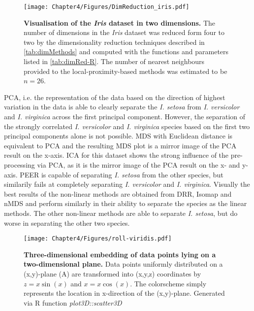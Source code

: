 \begin{figure}[h!]
	\centering
	\texttt{[image: Chapter4/Figures/DimReduction\_iris.pdf]}
	\caption[\textbf{Visualisation of the \textit{Iris} dataset in two dimensions.}]{\textbf{Visualisation of the \textit{Iris} dataset in two dimensions.} The number of dimensions in the \textit{Iris} dataset was reduced form four to two by the dimensionality reduction techniques described in \cref{tab:dimMethods} and computed with the functions and parameters listed in \cref{tab:dimRed-R}. The number of nearest neighbours provided to the local-proximity-based methods was estimated to be \(n=26\).} 
	 	\label{fig:dimRed-iris}
\end{figure}

PCA, i.e. the representation of the data based on the direction of highest variation in the data is able to clearly separate the \textit{I. setosa} from \textit{I. versicolor} and \textit{I. virginica} across the first principal component. However, the separation of the strongly correlated \textit{I. versicolor} and \textit{I. virginica} species based on the first two principal components alone is not possible. MDS with Euclidean distance is equivalent to PCA and the resulting MDS plot is a mirror image of the PCA result on the x-axis. ICA for this dataset shows the strong influence of the pre-processing via PCA, as it is the mirror image of the PCA result on the x- and y-axis. PEER is capable of separating \textit{I. setosa} from the other species, but similarily fails at completely separating \textit{I. versicolor} and \textit{I. virginica}. 
Visually the best results of the non-linear methods are obtained from DRR, Isomap and nMDS and perform similarly in their ability to separate the species as the linear methods. The other non-linear methods are able to separate \textit{I. setosa}, but do worse in separating the other two species.

\begin{figure}[p]
	\centering
	\texttt{[image: Chapter4/Figures/roll-viridis.pdf]}\\
	\caption[\textbf{Three-dimensional embedding of datapoints lying on a two-dimensional plane.}]{\textbf{Three-dimensional embedding of data points lying on a two-dimensional plane.} Data points uniformly distributed on a (x,y)-plane (A) are transformed into (x,y,z) coordinates by \(z = x \sin(x)\) and \(x = x \cos(x)\). The colorscheme simply represents the location in x-direction of the (x,y)-plane.  Generated via R function \textit{plot3D::scatter3D}}
 	\label{fig:roll}
\end{figure}

